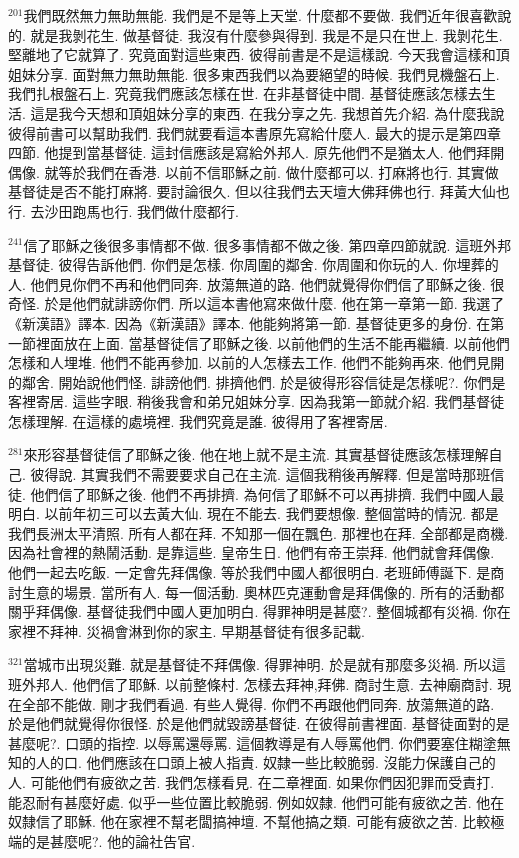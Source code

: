 \documentclass{book}
\begin{document}
$^{201}$我們既然無力無助無能.
我們是不是等上天堂.
什麼都不要做.
我們近年很喜歡說的.
就是我剝花生.
做基督徒.
我沒有什麼參與得到.
我是不是只在世上.
我剝花生.
堅離地了它就算了.
究竟面對這些東西.
彼得前書是不是這樣說.
今天我會這樣和頂姐妹分享.
面對無力無助無能.
很多東西我們以為要絕望的時候.
我們見機盤石上.
我們扎根盤石上.
究竟我們應該怎樣在世.
在非基督徒中間.
基督徒應該怎樣去生活.
這是我今天想和頂姐妹分享的東西.
在我分享之先.
我想首先介紹.
為什麼我說彼得前書可以幫助我們.
我們就要看這本書原先寫給什麼人.
最大的提示是第四章四節.
他提到當基督徒.
這封信應該是寫給外邦人.
原先他們不是猶太人.
他們拜開偶像.
就等於我們在香港.
以前不信耶穌之前.
做什麼都可以.
打麻將也行.
其實做基督徒是否不能打麻將.
要討論很久.
但以往我們去天壇大佛拜佛也行.
拜黃大仙也行.
去沙田跑馬也行.
我們做什麼都行.

$^{241}$信了耶穌之後很多事情都不做.
很多事情都不做之後.
第四章四節就說.
這班外邦基督徒.
彼得告訴他們.
你們是怎樣.
你周圍的鄰舍.
你周圍和你玩的人.
你埋葬的人.
他們見你們不再和他們同奔.
放蕩無道的路.
他們就覺得你們信了耶穌之後.
很奇怪.
於是他們就誹謗你們.
所以這本書他寫來做什麼.
他在第一章第一節.
我選了《新漢語》譯本.
因為《新漢語》譯本.
他能夠將第一節.
基督徒更多的身份.
在第一節裡面放在上面.
當基督徒信了耶穌之後.
以前他們的生活不能再繼續.
以前他們怎樣和人埋堆.
他們不能再參加.
以前的人怎樣去工作.
他們不能夠再來.
他們見開的鄰舍.
開始說他們怪.
誹謗他們.
排擠他們.
於是彼得形容信徒是怎樣呢?.
你們是客裡寄居.
這些字眼.
稍後我會和弟兄姐妹分享.
因為我第一節就介紹.
我們基督徒怎樣理解.
在這樣的處境裡.
我們究竟是誰.
彼得用了客裡寄居.

$^{281}$來形容基督徒信了耶穌之後.
他在地上就不是主流.
其實基督徒應該怎樣理解自己.
彼得說.
其實我們不需要要求自己在主流.
這個我稍後再解釋.
但是當時那班信徒.
他們信了耶穌之後.
他們不再排擠.
為何信了耶穌不可以再排擠.
我們中國人最明白.
以前年初三可以去黃大仙.
現在不能去.
我們要想像.
整個當時的情況.
都是我們長洲太平清照.
所有人都在拜.
不知那一個在飄色.
那裡也在拜.
全部都是商機.
因為社會裡的熱鬧活動.
是靠這些.
皇帝生日.
他們有帝王崇拜.
他們就會拜偶像.
他們一起去吃飯.
一定會先拜偶像.
等於我們中國人都很明白.
老班師傅誕下.
是商討生意的場景.
當所有人.
每一個活動.
奧林匹克運動會是拜偶像的.
所有的活動都關乎拜偶像.
基督徒我們中國人更加明白.
得罪神明是甚麼?.
整個城都有災禍.
你在家裡不拜神.
災禍會淋到你的家主.
早期基督徒有很多記載.

$^{321}$當城市出現災難.
就是基督徒不拜偶像.
得罪神明.
於是就有那麼多災禍.
所以這班外邦人.
他們信了耶穌.
以前整條村.
怎樣去拜神,拜佛.
商討生意.
去神廟商討.
現在全部不能做.
剛才我們看過.
有些人覺得.
你們不再跟他們同奔.
放蕩無道的路.
於是他們就覺得你很怪.
於是他們就毀謗基督徒.
在彼得前書裡面.
基督徒面對的是甚麼呢?.
口頭的指控.
以辱罵還辱罵.
這個教導是有人辱罵他們.
你們要塞住糊塗無知的人的口.
他們應該在口頭上被人指責.
奴隸一些比較脆弱.
沒能力保護自己的人.
可能他們有疲欲之苦.
我們怎樣看見.
在二章裡面.
如果你們因犯罪而受責打.
能忍耐有甚麼好處.
似乎一些位置比較脆弱.
例如奴隸.
他們可能有疲欲之苦.
他在奴隸信了耶穌.
他在家裡不幫老闆搞神壇.
不幫他搞之類.
可能有疲欲之苦.
比較極端的是甚麼呢?.
他的論社告官.
\end{document}

